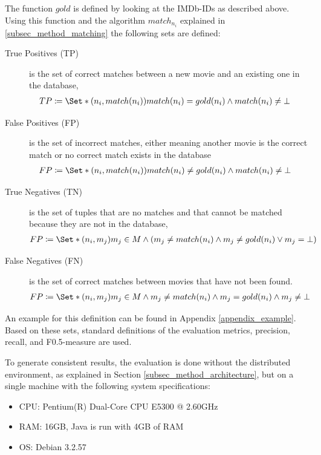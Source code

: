The function $gold$ is defined by looking at the IMDb-IDs as described above.
Using this function and the algorithm $match_{n_{i}}$ explained in \ref{subsec_method_matching} the following sets are defined:

\begin{description}
\item[True Positives (TP)] is the set of correct matches between a new movie and an existing one in the database,
\begin{align}
TP &\coloneqq \Set*{(n_i, match(n_i))}{match(n_i) = gold(n_i) \land match(n_i) \neq \bot}
\end{align}
\item[False Positives (FP)] is the set of incorrect matches, either meaning another movie is the correct match or no correct match exists in the database
\begin{align}
FP &\coloneqq \Set*{(n_i, match(n_i))}{match(n_i) \neq gold(n_i) \land match(n_i) \neq \bot}
\end{align}
\item[True Negatives (TN)] is the set of tuples that are no matches and that cannot be matched because they are not in the database,
\begin{align}
FP &\coloneqq \Set*{(n_i, m_j)}{m_j \in M \land (m_j \neq match(n_i) \land m_j \neq gold(n_i) \lor m_j = \bot)}
\end{align}
\item[False Negatives (FN)] is the set of correct matches between movies that have not been found.
\begin{align}
FP &\coloneqq \Set*{(n_i, m_j)}{m_j \in M \land m_j \neq match(n_i) \land m_j = gold(n_i) \land m_j \neq \bot}
\end{align}
\end{description}

An example for this definition can be found in Appendix \ref{appendix_example}.
Based on these sets, standard definitions of the evaluation metrics, precision, recall, and F0.5-measure are used.

To generate consistent results, the evaluation is done without the distributed environment, as explained in Section \ref{subsec_method_architecture}, but on a single machine with the following system specifications:
\begin{itemize}
	\item CPU: Pentium(R) Dual-Core  CPU E5300  @ 2.60GHz
	\item RAM: 16GB, Java is run with 4GB of RAM
	\item OS: Debian 3.2.57
\end{itemize}


